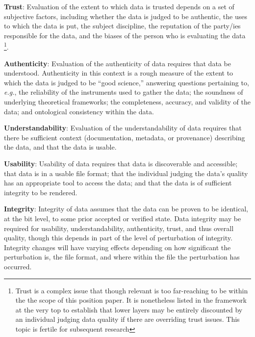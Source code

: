 \documentclass[man,12pt,biblatex]{apa6}
\begin{document}
\begin{APAitemize}
\item \textbf{Trust}: Evaluation of the extent to which data is
  trusted depends on a set of subjective factors, including whether
  the data is judged to be authentic, the uses to which the data is
  put, the subject discipline, the reputation of the party/ies
  responsible for the data, and the biases of the person who is
  evaluating the data \footnote{Trust is a complex issue that though
    relevant is too far-reaching to be within the the scope of this
    position paper. It is nonetheless listed in the framework at the
    very top to establish that lower layers may be entirely discounted
    by an individual judging data quality if there are overriding
    trust issues. This topic is fertile for subsequent research}.
\item \textbf{Authenticity}: Evaluation of the authenticity of data
  requires that data be understood. Authenticity in this context is a
  rough measure of the extent to which the data is judged to be ``good
  science,'' answering questions pertaining to, \textit{e.g.}, the
  reliability of the instruments used to gather the data; the
  soundness of underlying theoretical frameworks; the completeness,
  accuracy, and validity of the data; and ontological consistency
  within the data.
\item \textbf{Understandability}: Evaluation of the understandability
  of data requires that there be sufficient context (documentation,
  metadata, or provenance) describing the data, and that the data is
  usable.
\item \textbf{Usability}: Usability of data requires that data is
  discoverable and accessible; that data is in a usable file format;
  that the individual judging the data's quality has an appropriate
  tool to access the data; and that the data is of sufficient
  integrity to be rendered.
\item \textbf{Integrity}: Integrity of data assumes that the data can
  be proven to be identical, at the bit level, to some prior accepted
  or verified state. Data integrity may be required for usability,
  understandability, authenticity, trust, and thus overall quality,
  though this depends in part of the level of perturbation of
  integrity. Integrity changes will have varying effects depending on
  how significant the perturbation is, the file format, and where
  within the file the perturbation has occurred.
\end{APAitemize}
\end{document}
